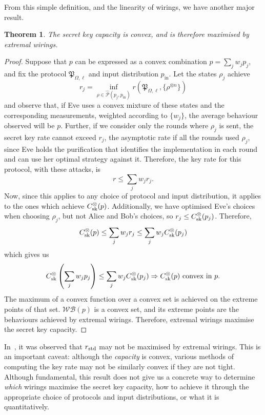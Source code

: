 \documentclass[10pt, a4paper]{article}
\numberwithin{equation}{section} %
\newcounter{stmt} %
\theoremstyle{definition}
\theoremstyle{plain}
\newtheorem{theorem}[stmt]{Theorem}
\newcommand{\?}{\mathrel{?}} %
\newcommand{\sWB}{\mathcal{WB}}
\newcommand{\compatstates}[3][]{\hat{\mathcal{P}}#1(#2,#3)}
\newcommand{\proto}[2][_{\Omega,\ell}]{\mathfrak{#2}#1}
\newcommand{\prin}[1][p]{#1_{\mathrm{in}}}
\newcommand{\sk}{\rm sk}
\newcommand{\std}{\rm std}
\begin{document}
                  From this simple definition, and the linearity of wirings, we have another major result.
                  \begin{theorem}\label{thm:extrcap}
                    The secret key capacity is convex, and is therefore maximised by extremal wirings.
                  \end{theorem}
                  \begin{proof}
                    Suppose that \(p\) can be expressed as a convex combination \(p = \sum_j w_j p_j\), and fix the protocol \(\proto{P}\) and input distribution \(\prin\). Let the states \(\rho_j\) achieve
                    \[ r_j = \inf_{\rho \in \compatstates{p_j}{\prin}} r\left(\proto{P}, \{\rho^{\otimes n}\} \right) \]
                    and observe that, if Eve uses a convex mixture of these states and the corresponding measurements, weighted according to \(\{w_j\}\), the average behaviour observed will be \(p\). Further, if we consider only the rounds where \(\rho_j\) is sent, the secret key rate cannot exceed \(r_j\), the asymptotic rate if all the rounds used \(\rho_j\), since Eve holds the purification that identifies the implementation in each round and can use her optimal strategy against it. Therefore, the key rate for this protocol, with these attacks, is
                    \[ r \leq \sum_j w_j r_j. \]
                    Now, since this applies to any choice of protocol and input distribution, it applies to the ones which achieve \(C_{\sk}^{\otimes}(p)\). Additionally, we have optimised Eve's choices when choosing \(\rho_j\), but not Alice and Bob's choices, so \(r_j \leq C_{\sk}^{\otimes}(p_j)\). Therefore,
                    \[ C_{\sk}^{\otimes}(p) \leq \sum_j w_j r_j \leq \sum_j w_j C_{\sk}^{\otimes}(p_j) \]
                    which gives us
                  \begin{equation}
                    C_{\sk}^{\otimes}\left(\sum_j w_j p_j\right) \leq \sum_j w_j C_{\sk}^{\otimes}(p_j) \Rightarrow C_{\sk}^{\otimes}(p)\text{ convex in }p.
                  \end{equation}
                  The maximum of a convex function over a convex set is achieved on the extreme points of that set. \(\sWB(p)\) is a convex set, and its extreme points are the behaviours achieved by extremal wirings. Therefore, extremal wirings maximise the secret key capacity.
                  \end{proof}

                  In~\cite{JanLiThesis}, it was observed that \(r_{\std}\) may not be maximised by extremal wirings. This is an important caveat: although the \emph{capacity} is convex, various methods of computing the key rate may not be similarly convex if they are not tight. Although fundamental, this result does not give us a concrete way to determine \emph{which} wirings maximise the secret key capacity, how to achieve it through the appropriate choice of protocols and input distributions, or what it is quantitatively.
\end{document}
